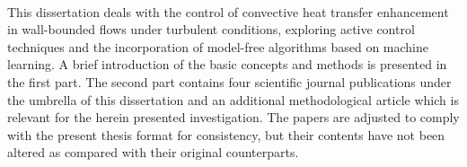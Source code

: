 %
\clearpage \newpage
\ \thispagestyle{empty}
\begin{preface}
This dissertation deals with the control of convective heat transfer enhancement in wall-bounded flows under turbulent conditions, exploring active control techniques and the incorporation of model-free algorithms based on machine learning.
%
A brief introduction of the basic concepts and methods is presented in the first part.
%
The second part contains four scientific journal publications under the umbrella of this dissertation and an additional methodological article which is relevant for the herein presented investigation.
%
The papers are adjusted to comply with the present thesis format for consistency, but their contents have not been altered as compared with their original counterparts.
\end{preface}


%
\begin{divisionofwork}
	
\end{divisionofwork}

%
\clearpage \newpage
\ \thispagestyle{empty}
\clearpage
\begin{otherpublications}
	
\end{otherpublications}

\begin{conferences}
	
\end{conferences}

%
\tableofcontents